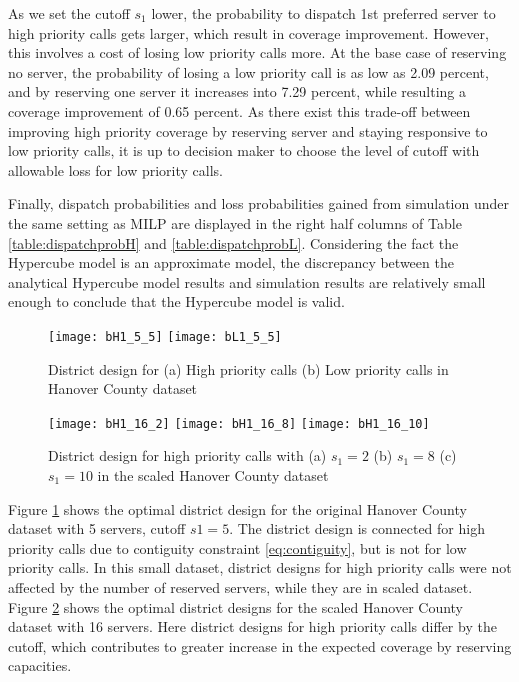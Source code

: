 \documentclass{article}
\begin{document}
As we set the cutoff $s_1$ lower, the probability to dispatch 1st preferred server to high priority calls gets larger, which result in coverage improvement. However, this involves a cost of losing low priority calls more. At the base case of reserving no server, the probability of losing a low priority call is as low as 2.09 percent, and by reserving one server it increases into 7.29 percent, while resulting a coverage improvement of 0.65 percent. As there exist this trade-off between improving high priority coverage by reserving server and staying responsive to low priority calls, it is up to decision maker to choose the level of cutoff with allowable loss for low priority calls. 


Finally, dispatch probabilities and loss probabilities gained from simulation under the same setting as MILP are displayed in the right half columns of Table \ref{table:dispatchprobH} and \ref{table:dispatchprobL}. Considering the fact the Hypercube model is an approximate model, the discrepancy between the analytical Hypercube model results and simulation results are relatively small enough to conclude that the Hypercube model is valid.

\begin{figure}
\texttt{[image: bH1\_5\_5]}
\texttt{[image: bL1\_5\_5]}
\caption{District design for (a) High priority calls (b) Low priority calls in Hanover County dataset}
\label{fig:district}
\end{figure}

\begin{figure}
\texttt{[image: bH1\_16\_2]}
\texttt{[image: bH1\_16\_8]}
\texttt{[image: bH1\_16\_10]}
\caption{District design for high priority calls with (a) $s_1=2$ (b) $s_1=8$ (c) $s_1=10$ in the scaled Hanover County dataset}
\label{fig:district_large}
\end{figure}

Figure \ref{fig:district} shows the optimal district design for the original Hanover County dataset with 5 servers, cutoff $s1=5$. The district design is connected for high priority calls due to contiguity constraint \ref{eq:contiguity}, but is not for low priority calls. In this small dataset, district designs for high priority calls were not affected by the number of reserved servers, while they are in scaled dataset. Figure \ref{fig:district_large} shows the optimal district designs for the scaled Hanover County dataset with 16 servers. Here district designs for high priority calls differ by the cutoff, which contributes to greater increase in the expected coverage by reserving capacities.
\end{document}
